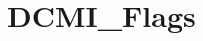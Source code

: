 \hypertarget{group___d_c_m_i___flags}{\section{D\-C\-M\-I\-\_\-\-Flags}
\label{group___d_c_m_i___flags}
}
